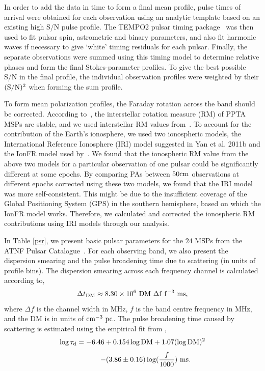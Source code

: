 \documentclass[useAMS,usenatbib]{mn2e}
\begin{document}
In order to add the data in time to form a final mean profile, pulse times of arrival 
were obtained for each observation using an analytic template based on an existing 
high S/N pulse profile. The TEMPO2 pulsar timing package~\citep{Hobbs06}  
was then used to fit pulsar spin, astrometric and binary parameters, and also fit 
harmonic waves if necessary to give ‘white’ timing residuals for each pulsar. Finally, 
the separate observations were summed using this timing model to determine relative 
phases and form the final Stokes-parameter profiles. To give the best possible S/N 
in the final profile, the individual observation profiles were weighted by their
$(\rm{S/N})^2$ when forming the sum profile. 

To form mean polarization profiles, the Faraday rotation across the band should be 
corrected. 
%
According to~\citet{Yan11b}, the interstellar rotation measure (RM) of PPTA MSPs are 
stable, and we used interstellar RM values from~\citet{Yan11}.
%
To account for the contribution of the Earth's ionosphere, we used two ionospheric 
models, the International Reference Ionosphere (IRI) model suggested in Yan et al. 2011b 
and the IonFR model used by~\citet{Sotomayor13}. 
%
We found that the ionospheric RM value from the above two models for a particular 
observation of one pulsar could be significantly different at some epochs. By 
comparing PAs between $50\rm{cm}$ observations at different epochs corrected using 
these two models, we found that the IRI model was more self-consistent. 
%
This might be due to the insufficient coverage of the Global Positioning System (GPS) in 
the southern hemisphere, based on which the IonFR model works.
%
Therefore, we calculated and corrected the ionospheric RM contributions using IRI models 
through our analysis.
%

In Table \ref{psr}, we present basic pulsar parameters for the $24$ MSPs
from the ATNF Pulsar Catalogue~\citep{Manchester05}.
%
For each observing band, we also present the dispersion smearing and the pulse 
broadening time due to scattering (in units of profile bins).
%
The dispersion smearing across each frequency channel is calculated according to, 
%
\begin{equation}
\Delta t_{\rm{DM}}\approx 8.30 \times 10^{6}\ \rm{DM}\ \Delta f\ f^{-3}\ \rm{ms},
\end{equation}
%
where $\Delta f$ is the channel width in MHz, $f$ is the band centre frequency in MHz, 
and the DM is in units of $\rm{cm^{-3}\ pc}$.
%
The pulse broadening time caused by scattering is estimated using the empirical fit 
from \citet{Bhat04}, 
%
\[
\log \tau_{\rm{d}} = -6.46+0.154\log\rm{DM}+1.07(\log\rm{DM})^2
\]
%
\begin{equation}
	\qquad\quad\ \ -(3.86\pm0.16)\log(\frac{f}{1000})\ \rm{ms}.
\end{equation}
%
\end{document}
